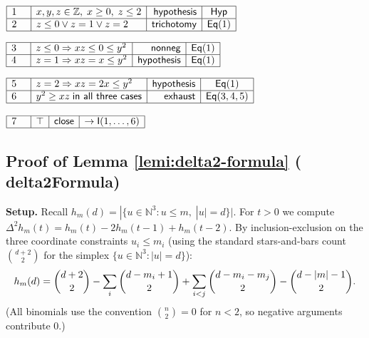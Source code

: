 \documentclass[11pt,reqno]{amsart}
\providecommand{\N}{\mathbb{N}}
\providecommand{\Z}{\mathbb{Z}}
\begin{document}
\noindent$%
\begin{array}{|m{0.5cm}|l|r|c|}
\hline
1 & x,y,z\in\Z,\;x\ge0,\;z\le2 & \mathsf{hypothesis} & \mathsf{Hyp} \\ \hline
2 & z\le0\vee z=1\vee z=2 & \mathsf{trichotomy} & \mathsf{Eq}(1) \\ \hline
\end{array}%
$

\nointerlineskip\noindent$%
\begin{array}{|m{0.5cm}|l|r|c|}
\hline
3 & z\le0\Rightarrow xz\le0\le y^{2} & \mathsf{nonneg} & \mathsf{Eq}(1) \\ 
\hline
4 & z=1\Rightarrow xz=x\le y^{2} & \mathsf{hypothesis} & \mathsf{Eq}(1) \\ 
\hline
\end{array}%
$

\nointerlineskip\noindent$%
\begin{array}{|m{0.5cm}|l|r|c|}
\hline
5 & z=2\Rightarrow xz=2x\le y^{2} & \mathsf{hypothesis} & \mathsf{Eq}(1) \\ 
\hline
6 & y^{2}\ge xz\;\mathsf{in\ all\ three\ cases} & \mathsf{exhaust} & \mathsf{%
Eq}(3,4,5) \\ \hline
\end{array}%
$

\nointerlineskip\noindent$%
\begin{array}{|m{0.5cm}|l|r|c|}
\hline
7 & \top & \mathsf{close} & \to\mathsf{I}(1,\dots,6) \\ \hline
\end{array}%
$

\medskip


\subsection*{Proof of Lemma \protect\ref{lemi:delta2-formula} (\textsf{%
delta2Formula})}

\noindent\textbf{Setup.} Recall $h_{m}(d)=|\{u\in\N^{3}:u\le m,\;|u|=d\}|$.
For $t>0$ we compute $\Delta^{2}h_{m}(t)=h_{m}(t)-2h_{m}(t-1)+h_{m}(t-2)$.
By inclusion-exclusion on the three coordinate constraints $u_{i}\le m_{i}$
(using the standard stars-and-bars count $\binom{d+2}{2}$ for the simplex $%
\{u\in\N^{3}:|u|=d\}$): 
\begin{equation*}
h_{m}(d)=\binom{d+2}{2}-\sum_{i}\binom{d-m_{i}+1}{2}+\sum_{i<j}\binom{%
d-m_{i}-m_{j}}{2}-\binom{d-|m|-1}{2}. 
\end{equation*}
(All binomials use the convention $\binom{n}{2}=0$ for $n<2$, so negative
arguments contribute 0.)
\end{document}
